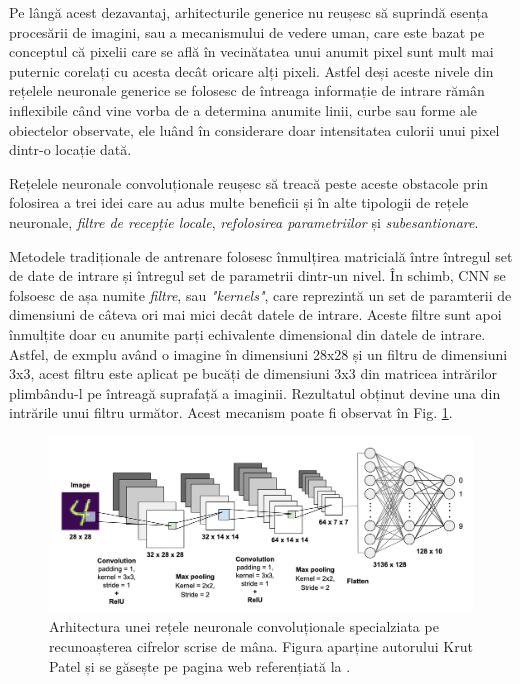 \documentclass[a4paper,12pt]{book}
\begin{document}
				Pe lângă acest dezavantaj, arhitecturile generice nu reușesc să suprindă esența procesării de imagini, sau a mecanismului de vedere uman, care este bazat pe conceptul că pixelii care se află în vecinătatea unui anumit pixel sunt mult mai puternic corelați cu acesta decât oricare alți pixeli. Astfel deși aceste nivele din rețelele neuronale generice se folosesc de întreaga informație de intrare rămân inflexibile când vine vorba de a determina anumite linii, curbe sau forme ale obiectelor observate, ele luând în considerare doar intensitatea culorii unui pixel dintr-o locație dată. \par
				
				Rețelele neuronale convoluționale reușesc să treacă peste aceste obstacole prin folosirea a trei idei care au adus multe beneficii și în alte tipologii de rețele neuronale,\textit{ filtre de recepție locale}, \textit{refolosirea parametriilor} și \textit{subesantionare}. \par
				
				Metodele tradiționale de antrenare folosesc înmulțirea matricială între întregul set de date de intrare și întregul set de parametrii dintr-un nivel. În schimb, CNN se folsoesc de așa numite \textit{filtre}, sau \textit{"kernels"}, care reprezintă un set de paramterii de dimensiuni de câteva ori mai mici decât datele de intrare. Aceste filtre sunt apoi înmulțite doar cu anumite parți echivalente dimensional din datele de intrare. Astfel, de exmplu având o imagine în dimensiuni 28x28 și un filtru de dimensiuni 3x3, acest filtru este aplicat pe bucăți de dimensiuni 3x3 din matricea intrărilor plimbându-l pe întreagă suprafață a imaginii. Rezultatul obținut devine una din intrările unui filtru următor. Acest mecanism poate fi observat în Fig. \ref{fig:cnns}.
					
				\begin{figure}[h]
					\centering
					\includegraphics[scale=0.23]{cnns}
					\caption{Arhitectura unei rețele neuronale convoluționale specialziata pe recunoașterea cifrelor scrise de mâna. Figura aparține autorului Krut Patel și se găsește pe pagina web referențiată la \cite{cnn_photo}.} 
					\label{fig:cnns}
				\end{figure}
				
\end{document}
